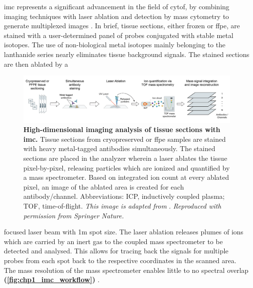 \par \gls{imc} represents a significant advancement in the field of \gls{cytof}, by combining imaging techniques with laser ablation and detection by mass cytometry to generate multiplexed images \textbf{\cite{veenstra_research_2021,chang_imaging_2017}}. In brief, tissue sections, either frozen or \gls{ffpe}, are stained with a user-determined panel of probes conjugated with stable metal isotopes. The use of non-biological metal isotopes mainly belonging to the lanthanide series nearly eliminates tissue background signals. The stained sections are then ablated by a 

\begin{figure}[H]
    \centering
    \includegraphics[width=\linewidth]{Chapter1/Fig/F1-12-01.png}
    \caption[Overview of  workflow]{\textbf{High-dimensional imaging analysis of tissue sections with \gls{imc}.} Tissue sections from cryopreserved or \gls{ffpe} samples are stained with heavy metal-tagged antibodies simultaneously. The stained sections are placed in the analyzer wherein a laser ablates the tissue pixel-by-pixel, releasing particles which are ionized and quantified by a mass spectrometer. Based on integrated ion count at every ablated pixel, an image of the ablated area is created for each antibody/channel. Abbreviations: ICP, inductively coupled plasma; TOF, time-of-flight. \textit{This image is adapted from }\textbf{\cite{damond_map_2019,hartmann_immune_2020}}. \textit{Reproduced with permission from Springer Nature.}}
    \label{fig:chp1_imc_workflow}
\end{figure}

focused laser beam with 1\textmu m spot size. The laser ablation releases plumes of ions which are carried by an inert gas to the coupled mass spectrometer to be detected and analysed. This allows for tracing back the signals for multiple probes from each spot back to the respective coordinates in the scanned area. The mass resolution of the mass spectrometer enables little to no spectral overlap \textbf{(\autoref{fig:chp1_imc_workflow})} \textbf{\cite{veenstra_research_2021,chang_imaging_2017}}.\\


